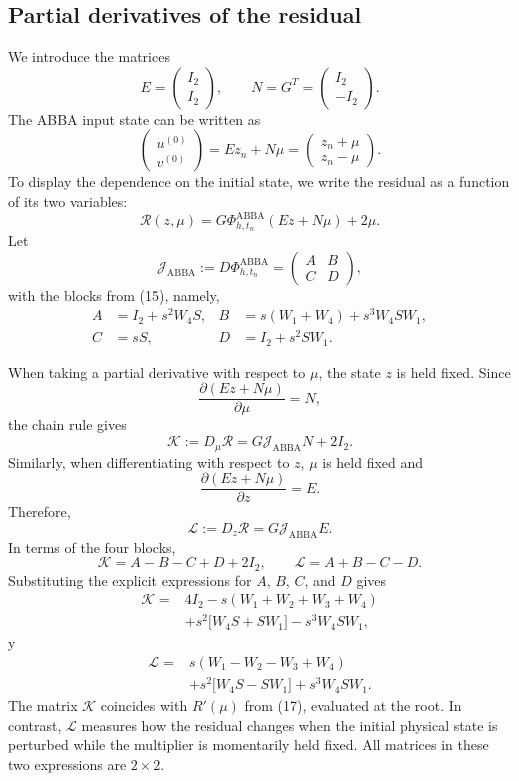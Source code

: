 \documentclass[11pt,a4paper]{article}
\newcommand{\Id}{I}
\newcommand{\PhiAB}{\Phi^{\mathrm{ABBA}}_{h,t_n}}
\begin{document}
\subsection{Partial derivatives of the residual}

We introduce the matrices
\[
 E=
 \begin{pmatrix}\Id_2\\\Id_2\end{pmatrix},
 \qquad
 N=G^T=
 \begin{pmatrix}\Id_2\\-\Id_2\end{pmatrix}.
\]
The ABBA input state can be written as
\[
 \begin{pmatrix}u^{(0)}\\v^{(0)}\end{pmatrix}
 =Ez_n+N\mu
 =\begin{pmatrix}z_n+\mu\\z_n-\mu\end{pmatrix}.
\]
To display the dependence on the initial state, we write the residual as a function of its
two variables:
\[
 \mathcal R(z,\mu)
 =G\PhiAB(Ez+N\mu)+2\mu.
\]
Let
\[
 \mathcal J_{\mathrm{ABBA}}
 :=D\PhiAB
 =\begin{pmatrix}A&B\\C&D\end{pmatrix},
\]
with the blocks from (15), namely,
\[
 \begin{aligned}
 A&=\Id_2+s^2W_4S,
 &B&=s(W_1+W_4)+s^3W_4SW_1,\\
 C&=sS,
 &D&=\Id_2+s^2SW_1.
 \end{aligned}
\]

When taking a partial derivative with respect to $\mu$, the state $z$ is held fixed. Since
\[
 \frac{\partial(Ez+N\mu)}{\partial\mu}=N,
\]
the chain rule gives
\[
 \boxed{
 \mathcal K
 :=D_\mu\mathcal R
 =G\mathcal J_{\mathrm{ABBA}}N+2\Id_2.
 }
\]
Similarly, when differentiating with respect to $z$, $\mu$ is held fixed and
\[
 \frac{\partial(Ez+N\mu)}{\partial z}=E.
\]
Therefore,
\[
 \boxed{
 \mathcal L
 :=D_z\mathcal R
 =G\mathcal J_{\mathrm{ABBA}}E.
 }
\]
In terms of the four blocks,
\[
 \boxed{
 \mathcal K=A-B-C+D+2\Id_2,
 \qquad
 \mathcal L=A+B-C-D.
 }
\]
Substituting the explicit expressions for $A$, $B$, $C$, and $D$ gives
\[
 \boxed{
 \begin{aligned}
 \mathcal K={}&4\Id_2
 -s(W_1+W_2+W_3+W_4)\\
 &+s^2\bigl[W_4S+SW_1\bigr]
 -s^3W_4SW_1,
 \end{aligned}
 }
\]
y
\[
 \boxed{
 \begin{aligned}
 \mathcal L={}&s(W_1-W_2-W_3+W_4)\\
 &+s^2\bigl[W_4S-SW_1\bigr]
 +s^3W_4SW_1.
 \end{aligned}
 }
\]
The matrix $\mathcal K$ coincides with $R'(\mu)$ from (17), evaluated at the root. In
contrast, $\mathcal L$ measures how the residual changes when the initial physical state
is perturbed while the multiplier is momentarily held fixed. All matrices in these two
expressions are $2\times2$.
\end{document}
